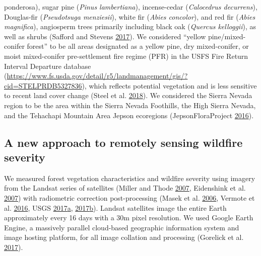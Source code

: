 \documentclass[twoside,12pt,final]{ucthesis-CA2012}
\begin{document}
\begin{ucmainmatter}
{ponderosa}), sugar pine (\emph{Pinus lambertiana}), incense-cedar
(\emph{Calocedrus decurrens}), Douglas-fir (\emph{Pseudotsuga
menziesii}), white fir (\emph{Abies concolor}), and red fir (\emph{Abies
magnifica}), angiosperm trees primarily including black oak
(\emph{Quercus kelloggii}), as well as shrubs (Safford and Stevens
\protect\hyperlink{ref-safford2017}{2017}). We considered ``yellow
pine/mixed-conifer forest'' to be all areas designated as a yellow pine,
dry mixed-conifer, or moist mixed-conifer pre-settlement fire regime
(PFR) in the USFS Fire Return Interval Departure database
(\url{https://www.fs.usda.gov/detail/r5/landmanagement/gis/?cid=STELPRDB5327836}),
which reflects potential vegetation and is less sensitive to recent land
cover change (Steel et al. \protect\hyperlink{ref-steel2018}{2018}). We
considered the Sierra Nevada region to be the area within the Sierra
Nevada Foothills, the High Sierra Nevada, and the Tehachapi Mountain
Area Jepson ecoregions (JepsonFloraProject
\protect\hyperlink{ref-jepsonfloraproject2016}{2016}).

\subsection{A new approach to remotely sensing wildfire
severity}\label{a-new-approach-to-remotely-sensing-wildfire-severity-1}

We measured forest vegetation characteristics and wildfire severity
using imagery from the Landsat series of satellites (Miller and Thode
\protect\hyperlink{ref-miller2007}{2007}, Eidenshink et al.
\protect\hyperlink{ref-eidenshink2007}{2007}) with radiometric
correction post-processing (Masek et al.
\protect\hyperlink{ref-masek2006}{2006}, Vermote et al.
\protect\hyperlink{ref-vermote2016}{2016}, USGS
\protect\hyperlink{ref-usgs2017a}{2017}\protect\hyperlink{ref-usgs2017a}{a},
\protect\hyperlink{ref-usgs2017}{2017}\protect\hyperlink{ref-usgs2017}{b}).
Landsat satellites image the entire Earth approximately every 16 days
with a 30m pixel resolution. We used Google Earth Engine, a massively
parallel cloud-based geographic information system and image hosting
platform, for all image collation and processing (Gorelick et al.
\protect\hyperlink{ref-gorelick2017}{2017}).


\end{ucmainmatter}
\end{document}
